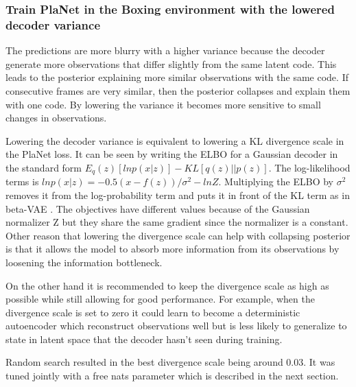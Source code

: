 \subsubsection{Train PlaNet in the Boxing environment with the lowered decoder variance}

The predictions are more blurry with a higher variance because the decoder generate more observations that differ slightly from the same latent code. This leads to the posterior explaining more similar observations with the same code. If consecutive frames are very similar, then the posterior collapses and explain them with one code. By lowering the variance it becomes more sensitive to small changes in observations. 

Lowering the decoder variance is equivalent to lowering a KL divergence scale in the PlaNet loss. It can be seen by writing the ELBO for a Gaussian decoder in the standard form $E_q(z)[lnp(x|z)]-KL[q(z) || p(z)]$. The log-likelihood terms is $lnp(x|z) = -0.5(x-f(z))/\sigma^2-lnZ$. Multiplying the ELBO by $\sigma^2$ removes it from the log-probability term and puts it in front of the KL term as in beta-VAE \cite{Algo.betaVAE}. The objectives have different values because of the Gaussian normalizer Z but they share the same gradient since the normalizer is a constant.
Other reason that lowering the divergence scale can help with collapsing posterior is that it allows the model to absorb more information from its observations by loosening the information bottleneck.

On the other hand it is recommended to keep the divergence scale as high as possible while still allowing for good performance. For example, when the divergence scale is set to zero it could learn to become a deterministic autoencoder which reconstruct observations well but is less likely to generalize to state in latent space that the decoder hasn't seen during training.

Random search resulted in the best divergence scale being around 0.03. It was tuned jointly with a free nats parameter which is described in the next section.

